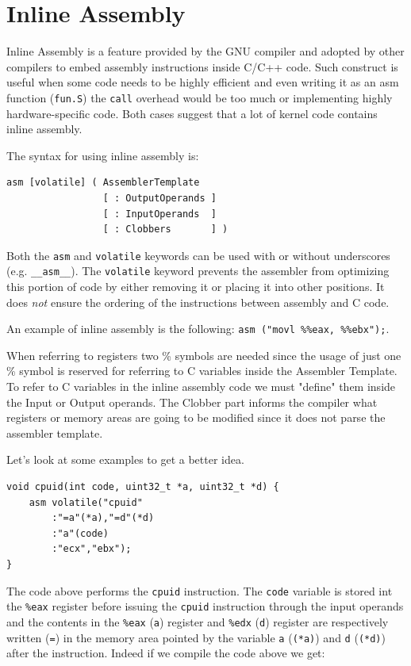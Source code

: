 \documentclass[twoside]{article}
\begin{document}
\section{Inline Assembly}

Inline Assembly is a feature provided by the GNU compiler and adopted by other compilers to embed assembly instructions inside C/C++ code. Such construct is useful when some code needs to be highly efficient and even writing it as an asm function (\texttt{fun.S}) the \texttt{call} overhead would be too much or implementing highly hardware-specific code. Both cases suggest that a lot of kernel code contains inline assembly.

The syntax for using inline assembly is:
\begin{verbatim}
asm [volatile] ( AssemblerTemplate 
                 [ : OutputOperands ]
                 [ : InputOperands  ]
                 [ : Clobbers       ] )
\end{verbatim}

Both the \texttt{asm} and \texttt{volatile} keywords can be used with or without underscores (e.g. \texttt{__asm__}). The \texttt{volatile} keyword prevents the assembler from optimizing this portion of code by either removing it or placing it into other positions. It does \textit{not} ensure the ordering of the instructions between assembly and C code.

An example of inline assembly is the following: \texttt{asm ("movl \%\%eax, \%\%ebx");}.

When referring to registers two \% symbols are needed since the usage of just one \% symbol is reserved for referring to C variables inside the Assembler Template. To refer to C variables in the inline assembly code we must "define" them inside the Input or Output operands. The Clobber part informs the compiler what registers or memory areas are going to be modified since it does not parse the assembler template.

Let's look at some examples to get a better idea.
\begin{verbatim}
void cpuid(int code, uint32_t *a, uint32_t *d) {
    asm volatile("cpuid"
        :"=a"(*a),"=d"(*d)
        :"a"(code)
        :"ecx","ebx");
} 
\end{verbatim}

The code above performs the \texttt{cpuid} instruction. The \texttt{code} variable is stored int the \texttt{\%eax} register before issuing the \texttt{cpuid} instruction through the input operands and the contents in the \texttt{\%eax} (\texttt{a}) register and \texttt{\%edx} (\texttt{d}) register are respectively written (\texttt{=}) in the memory area pointed by the variable \texttt{a} (\texttt{(*a)}) and \texttt{d} (\texttt{(*d)}) after the instruction.
Indeed if we compile the code above we get:
\end{document}
